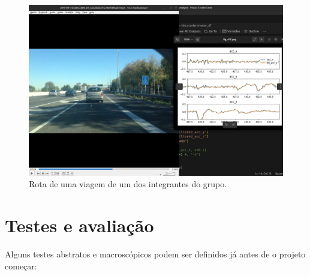 \begin{figure}[hp]
    \centering
    
    \includegraphics[scale=0.3]{figures/rota_integrante.jpg}
    
    \caption{Rota de uma viagem de um dos integrantes do grupo.}
    \label{fig:rota1integrante}
\end{figure}

\section{Testes e avaliação}
Alguns testes abstratos e macroscópicos podem ser definidos já antes de o projeto começar:

